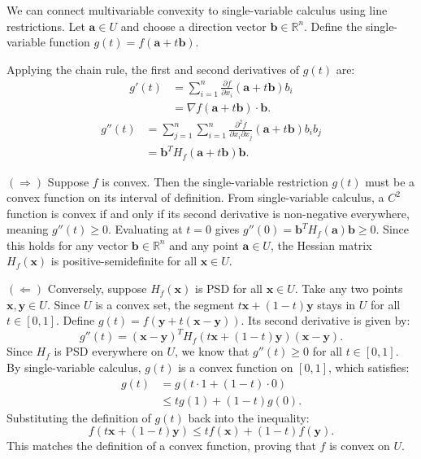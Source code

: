 \begin{pfbox}
	We can connect multivariable convexity to single-variable calculus using line restrictions. Let $\mathbf{a} \in U$ and choose a direction vector $\mathbf{b} \in \mathbb{R}^n$. Define the single-variable function $g(t) = f(\mathbf{a} + t\mathbf{b})$.

	Applying the chain rule, the first and second derivatives of $g(t)$ are:
	\begin{align*}
		g'(t)
		 & = \sum_{i=1}^n \frac{\partial f}{\partial x_i}(\mathbf{a}+t\mathbf{b})b_i \\
		 & = \nabla f(\mathbf{a}+t\mathbf{b})\cdot\mathbf{b}.
	\end{align*}
	\begin{align*}
		g''(t)
		 & = \sum_{j=1}^n\sum_{i=1}^n
		\frac{\partial^2 f}{\partial x_i\partial x_j}(\mathbf{a}+t\mathbf{b})b_i b_j \\
		 & = \mathbf{b}^T H_f(\mathbf{a}+t\mathbf{b})\mathbf{b}.
	\end{align*}

	$(\Rightarrow)$ Suppose $f$ is convex. Then the single-variable restriction $g(t)$ must be a convex function on its interval of definition. From single-variable calculus, a $C^2$ function is convex if and only if its second derivative is non-negative everywhere, meaning $g''(t) \ge 0$. Evaluating at $t=0$ gives $g''(0) = \mathbf{b}^T H_f(\mathbf{a}) \mathbf{b} \ge 0$. Since this holds for any vector $\mathbf{b} \in \mathbb{R}^n$ and any point $\mathbf{a} \in U$, the Hessian matrix $H_f(\mathbf{x})$ is positive-semidefinite for all $\mathbf{x} \in U$.

	$(\Leftarrow)$ Conversely, suppose $H_f(\mathbf{x})$ is PSD for all $\mathbf{x} \in U$. Take any two points $\mathbf{x}, \mathbf{y} \in U$. Since $U$ is a convex set, the segment $t\mathbf{x} + (1-t)\mathbf{y}$ stays in $U$ for all $t \in [0,1]$. Define $g(t) = f(\mathbf{y} + t(\mathbf{x}-\mathbf{y}))$. Its second derivative is given by:
	$$
		g''(t) = (\mathbf{x}-\mathbf{y})^T H_f(t\mathbf{x} + (1-t)\mathbf{y}) (\mathbf{x}-\mathbf{y}).
	$$
	Since $H_f$ is PSD everywhere on $U$, we know that $g''(t) \ge 0$ for all $t \in [0,1]$. By single-variable calculus, $g(t)$ is a convex function on $[0,1]$, which satisfies:
	\begin{align*}
		g(t)
		 & = g(t\cdot 1+(1-t)\cdot 0) \\
		 & \le tg(1)+(1-t)g(0).
	\end{align*}
	Substituting the definition of $g(t)$ back into the inequality:
	$$
		f(t\mathbf{x} + (1-t)\mathbf{y}) \le t f(\mathbf{x}) + (1-t) f(\mathbf{y}).
	$$
	This matches the definition of a convex function, proving that $f$ is convex on $U$.
\end{pfbox}

